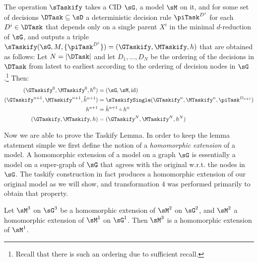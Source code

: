 \begin{definition}  \label{def:taskify-construction-full}
The operation $\sTaskify$ takes a CID $\sG$, a model $\sM$ on it, and for some set of decisions $\DTask\subseteq \sD$ 
a deterministic decision rule $\piTask^{D^i}$ for each $D^i \in \DTask$ that depends only on a single parent $X^i$ in the minimal
$d$-reduction of $\sG$, and outputs a triple $\sTaskify(\sG, M, \{\piTask^{D^i}\}) = (\GTaskify, \MTaskify, h)$ that are obtained as 
follows: Let $N=|\DTask|$ and let $D_1,...,D_N$ be the ordering of the decisions in $\DTask$ from latest to earliest according to the ordering of decision nodes in $\sG$.\footnote{Recall that there is such an ordering due to sufficient recall.} Then:
\begin{align*}
    (\GTaskify^0, \MTaskify^0,h^0) &= (\sG, \sM, \mathrm{id})\\
    (\GTaskify^{n+1}, \MTaskify^{n+1}, \tilde h^{n+1}) &= \sTaskifySingle(\GTaskify^n, \MTaskify^n, \piTask^{D_{n+1}})\\
    h^{n+1} &= \tilde h^{n+1}\circ h^n\\
    (\GTaskify, \MTaskify, h) &= (\GTaskify^N, \MTaskify^N, h^N)
\end{align*}
\end{definition}








Now we are able to prove the Taskify Lemma. In order to keep the lemma statement simple we first define the notion of a \textit{homomorphic extension} of a model. A homomorphic extension of a model on a graph $\sG$ is essentially a model on a super-graph of $\sG$ that agrees with the original w.r.t. the nodes in $\sG$. The taskify construction in fact produces a homomorphic extension of our original model as we will show, and transformation 4 was performed primarily to obtain that property.


\begin{lemma}\label{le:21-aug9.1-composition-of-homomorphic-extensions}Let $\sM^3$ on $\sG^3$ be a homomorphic extension of $\sM^2$ on $\sG^2$, and $\sM^2$ a homomorphic extension of $\sM^1$ on $\sG^1$. Then $\sM^3$ is a homomorphic extension of $\sM^1$. 
\end{lemma}


